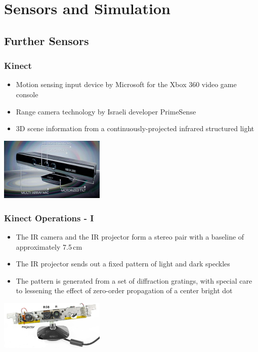 \section{Sensors and Simulation}
\subsection{Further Sensors}

\begin{frame} 
 \frametitle{Kinect}
\begin{itemize}
 \item Motion sensing input device by Microsoft for the Xbox 360 video game console
 \item Range camera technology by Israeli developer PrimeSense
 \item 3D scene information from a continuously-projected infrared structured light
\end{itemize}
\hspace{35ex}\includegraphics[width=5cm]{img/kinect.png}
\end{frame}

\begin{frame}
 \frametitle{Kinect Operations - I}

\begin{itemize}
  \item The IR camera and the IR projector form a stereo pair with a baseline of approximately 7.5\,cm
  \item The IR projector sends out a fixed pattern of light and dark speckles
  \item The pattern is generated from a set of diffraction gratings, with special care to lessening the effect of zero-order propagation of a center bright dot
\end{itemize}
\hspace{35ex}\includegraphics[width=5cm]{img/kinect2.png} 
\end{frame}

